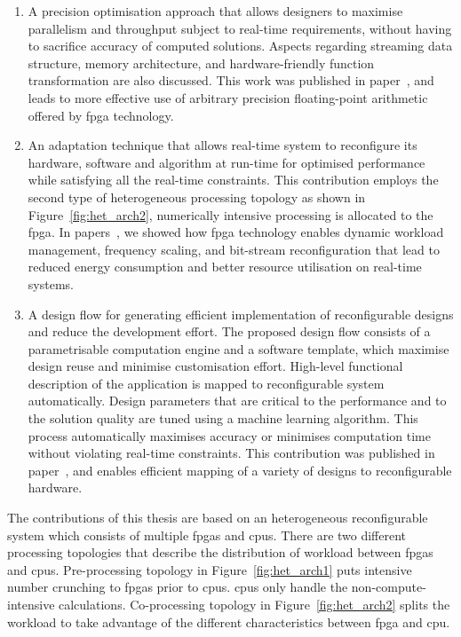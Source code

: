 \begin{enumerate}
\item A precision optimisation approach that allows designers to maximise parallelism and throughput subject to real-time requirements, without having to sacrifice accuracy of computed solutions.
Aspects regarding streaming data structure, memory architecture, and hardware-friendly function transformation are also discussed.
This work was published in paper~\cite{chau13fpt}, and leads to more effective use of arbitrary precision floating-point arithmetic offered by \gls{fpga} technology.
\item An adaptation technique that allows real-time system to reconfigure its hardware, software and algorithm at run-time for optimised performance while satisfying all the real-time constraints.
This contribution employs the second type of heterogeneous processing topology as shown in Figure~\ref{fig:het_arch2}, numerically intensive processing is allocated to the \gls{fpga}.
In papers~\cite{chau13arc,chau14trets}, we showed how \gls{fpga} technology enables dynamic workload management, frequency scaling, and bit-stream reconfiguration that lead to reduced energy consumption and better resource utilisation on real-time systems. 
\item A design flow for generating efficient implementation of reconfigurable designs and reduce the development effort.
The proposed design flow consists of a parametrisable computation engine and a software template, which maximise design reuse and minimise customisation effort.
High-level functional description of the application is mapped to reconfigurable system automatically.
Design parameters that are critical to the performance and to the solution quality are tuned using a machine learning algorithm.
This process automatically maximises accuracy or minimises computation time without violating real-time constraints.
This contribution was published in paper~\cite{chau14fccm}, and enables efficient mapping of a variety of designs to reconfigurable hardware.
\end{enumerate}

The contributions of this thesis are based on an heterogeneous reconfigurable system which consists of multiple \glspl{fpga} and \glspl{cpu}.
There are two different processing topologies that describe the distribution of workload between \glspl{fpga} and \glspl{cpu}.
Pre-processing topology in Figure~\ref{fig:het_arch1} puts intensive number crunching to \glspl{fpga} prior to \glspl{cpu}.
\glspl{cpu} only handle the non-compute-intensive calculations.
Co-processing topology in Figure~\ref{fig:het_arch2} splits the workload to take advantage of the different characteristics between \gls{fpga} and \gls{cpu}.

